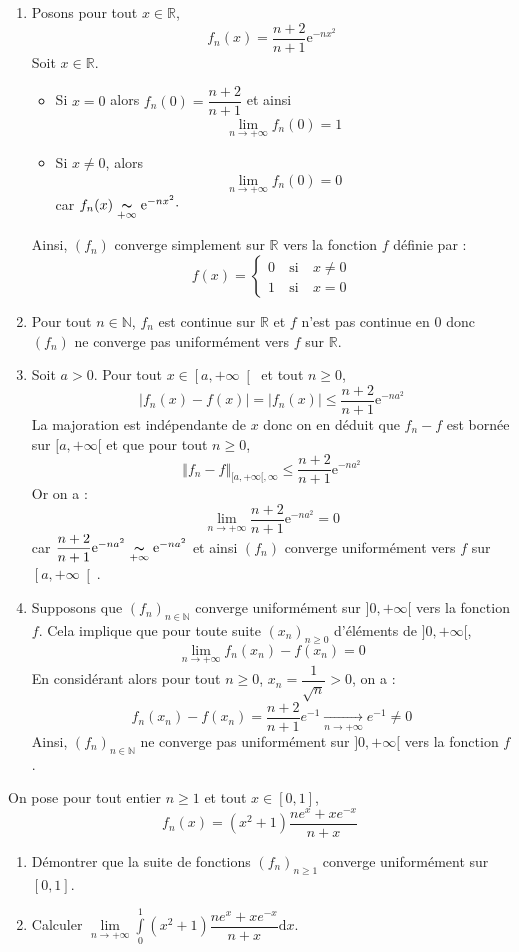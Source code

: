 \documentclass[a4paper,10pt]{report}
\begin{document}
\corr \begin{enumerate}
\item Posons pour tout $ x\in\mathbb{R}$, 
$$f_{n}(x) =\dfrac{n+2}{n+1}\mathrm{e}^{-n x^{2}}$$
Soit $x\in\mathbb{R}$.
\begin{itemize}
\item Si $x=0$ alors $f_n(0)=\dfrac{n+2}{n+1}$ et ainsi
$$\lim\limits_{n\to+\infty}^{}f_n(0)=1$$
\item Si $x\neq 0$, alors 
$$\lim\limits_{n\to+\infty}^{}f_n(0)=0$$ 
car $f_n(x)\underset{+\infty}{\thicksim}\mathrm{e}^{-nx^2} \cdot$
\end{itemize}
Ainsi, $(f_n)$ converge simplement sur $\mathbb{R}$ vers la fonction $f$ définie par :
 $$f(x)=\left\lbrace \begin{array}{lll}
 0&\:\text{si}\:& x\neq 0\\
 1&\:\text{si}\:& x=0
 \end{array}\right.  $$
\item Pour tout $n \in \mathbb{N}$, $f_n$ est continue sur $\mathbb{R}$ et $f$ n'est pas continue en $0$ donc $(f_n)$ ne converge pas uniformément vers $f$ sur $\mathbb{R}$.
\item  Soit $a>0$. Pour tout $x\in \left[a,+\infty \right[$ et tout $n \geq 0$,
$$|f_n(x)-f(x)|=|f_n(x)|\leq \dfrac{n+2}{n+1}\mathrm{e}^{-n a^{2}}$$
La majoration est indépendante de $x$ donc on en déduit que $f_n-f$ est bornée sur $[a, + \infty[$ et que pour tout $n \geq 0$, 
$$ \Vert f_n - f \Vert_{[a, + \infty[,\infty} \leq \dfrac{n+2}{n+1}\mathrm{e}^{-n a^{2}}$$
Or on a :
$$\lim\limits_{n\to +\infty}^{}\dfrac{n+2}{n+1}\mathrm{e}^{-n a^{2}}=0$$
car $\dfrac{n+2}{n+1}\mathrm{e}^{-n a^{2}}\underset{+\infty}{\thicksim}\mathrm{e}^{-n a^{2}}$ et ainsi $(f_n)$ converge uniformément vers $f$ sur $\left[a,+\infty \right[$.
\item Supposons que $\left(f_{n}\right) _{n\in \mathbb{N}}$ converge uniform\'{e}ment sur $]0,+\infty[$ vers la fonction $f$. Cela implique que pour toute suite $(x_n)_{n \geq 0}$ d'éléments de $]0, + \infty[$,
$$ \lim_{n \rightarrow + \infty} f_n(x_n) - f(x_n) = 0$$
En considérant alors pour tout $n \geq 0$, $x_n = \dfrac{1}{\sqrt{n}}>0$, on a :
$$ f_n(x_n)-f(x_n) = \dfrac{n+2}{n+1} e^{-1} \underset{n \rightarrow + \infty}{\rightarrow} e^{-1} \neq 0$$
Ainsi, $\left(f_{n}\right) _{n\in \mathbb{N}}$ ne converge pas uniform\'{e}ment sur $]0,+\infty[$ vers la fonction $f$.
\end{enumerate}

\begin{Exa}On pose pour tout entier $n \geq 1$ et tout $x \in [0,1]$,
$$f_{n}\left( x\right) =\left( x^{2}+1\right) \dfrac{ne^{x}+xe^{-x}}{n+x} $$

\begin{enumerate}
\item Démontrer que la suite de fonctions $\left( f_{n}\right) _{n \geq 1}$ converge uniform\'{e}ment sur $[0,1]$.
\item Calculer $\underset{n\rightarrow +\infty }{\lim }\displaystyle\int\limits_{0}^{1}\left( x^{2}+1\right) \dfrac{ne^{x}+xe^{-x}}{n+x}\text{d}x$.
\end{enumerate}
\end{Exa} 
\end{document}
